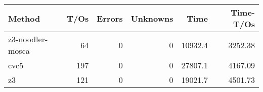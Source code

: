 \begin{tabular}{lrrrrr}
\hline
 Method           &   T/Os &   Errors &   Unknowns &    Time &   Time-T/Os \\
\hline
 z3-noodler-mosca &     64 &        0 &          0 & 10932.4 &     3252.38 \\
 cvc5             &    197 &        0 &          0 & 27807.1 &     4167.09 \\
 z3               &    121 &        0 &          0 & 19021.7 &     4501.73 \\
\hline
\end{tabular}

